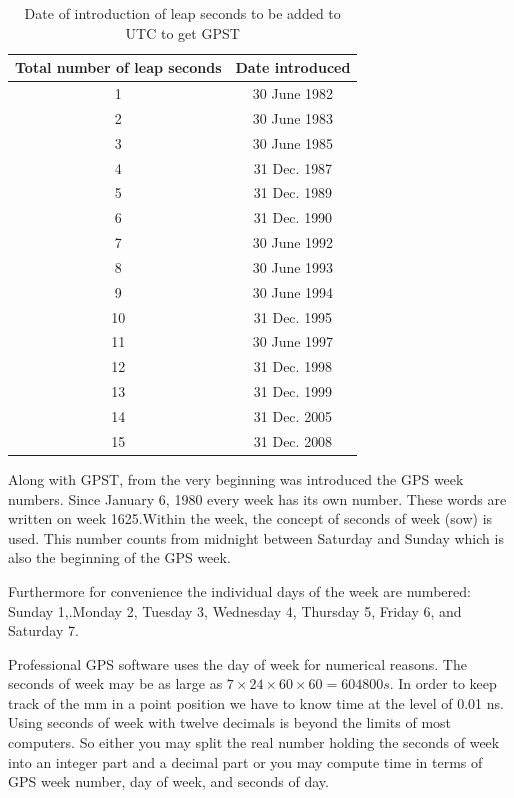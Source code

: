 	\begin{table}
		\centering
		\caption{Date of introduction of leap seconds to be added to UTC to get GPST}
		\label{tab:9.2}
		\begin{tabular}{cc}
			\hline Total number of leap seconds & Date introduced \\ 
			\hline  1 & 30 June 1982 \\ 
			  2 & 30 June 1983 \\ 
			  3 & 30 June 1985 \\ 
			  4 & 31 Dec. 1987 \\ 
			  5 & 31 Dec. 1989 \\ 
			  6 & 31 Dec. 1990 \\ 
			  7 & 30 June 1992 \\ 
			  8 & 30 June 1993 \\ 
			  9 & 30 June 1994 \\ 
			 10 & 31 Dec. 1995 \\ 
			 11 & 30 June 1997 \\ 
			 12 & 31 Dec. 1998 \\ 
			 13 & 31 Dec. 1999 \\ 
			 14 & 31 Dec. 2005 \\ 
			 15 & 31 Dec. 2008 \\ 
			\hline 
		\end{tabular} 
	\end{table}
	
	
	Along with GPST, from the very beginning was introduced the GPS week numbers. Since January 6, 1980 every week has its own number. These words are written on week 1625.Within the week, the concept of seconds of week (sow) is used. This number counts from midnight between Saturday and Sunday which is also the beginning of the GPS week.
	
	Furthermore for convenience the individual days of the week are numbered: Sunday 1,.Monday 2, Tuesday 3, Wednesday 4, Thursday 5, Friday 6, and Saturday 7.
	
	Professional GPS software uses the day of week for numerical reasons. The seconds of week may be as large as $7 \times 24 \times 60 \times 60 = 604 800 s$. In order to keep track of the mm in a point position we have to know time at the level of 0.01 ns. Using seconds of week with twelve decimals is beyond the limits of most computers. So either you may split the real number holding the seconds of week into an integer part and a decimal part or you may compute time in terms of GPS week number, day of week, and seconds of day.
	
